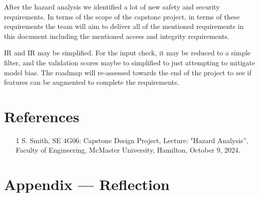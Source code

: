 \documentclass{article}
\begin{document}
After the hazard analysis we identified a lot of new safety and security requirements. In terms of the scope of the capstone project, in terms of these requirements the team will aim to deliver all of the mentioned requirements in this document including the mentioned access and integrity requirements. 

IR\label{IR_InputCheck} and IR\label{IR_ValidationScore} may be simplified. For the input check, it may be reduced to a simple filter, and the validation scores maybe to simplified to just attempting to mitigate model bias. The roadmap will re-assessed towards the end of the project to see if features can be augmented to complete the requirements.
\newpage{}

\section{References}

\begin{itemize}
    \item [1] S. Smith, SE 4G06: Capstone Design Project, Lecture: "Hazard Analysis”, Faculty of Engineering, McMaster University, Hamilton, October 9, 2024.
\end{itemize}

\newpage{}

\section*{Appendix --- Reflection}



\end{document}
